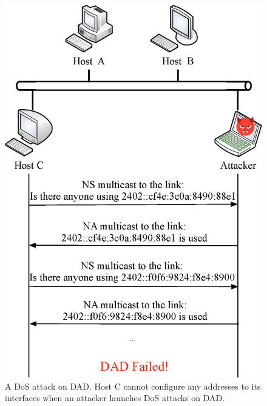 \documentclass[a4paper,fleqn]{cas-dc}
\begin{document}
        \begin{figure}
        \centerline{
            \includegraphics[scale=0.50]{figure/DAD-DoS.eps}
        }
        \caption{A DoS attack on DAD. Host C cannot configure any addresses to its interfaces when an attacker launches DoS attacks on DAD.}
        \label{fig:DoS-Attack-on-DAD}
        \end{figure}
\end{document}
